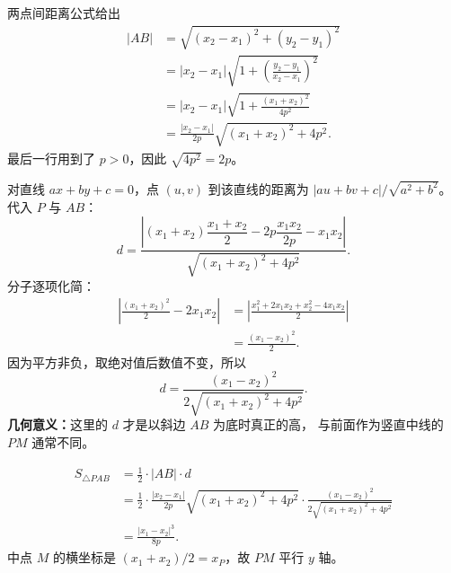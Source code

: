 \begin{proofbox}
\begin{description}[style=nextline, leftmargin=2.8em, labelsep=0.5em, itemsep=0.55em]
        \item[\textbf{第四步（求底边长度）：}]
        两点间距离公式给出
        \[
        \begin{aligned}
            |AB|
            &=\sqrt{(x_2-x_1)^2+(y_2-y_1)^2}\\
            &=|x_2-x_1|\sqrt{1+
              \left(\frac{y_2-y_1}{x_2-x_1}\right)^2}\\
            &=|x_2-x_1|\sqrt{1+
              \frac{(x_1+x_2)^2}{4p^2}}\\
            &=\boxed{\frac{|x_2-x_1|}{2p}
              \sqrt{(x_1+x_2)^2+4p^2}}.
        \end{aligned}
        \]
        最后一行用到了 $p>0$，因此 $\sqrt{4p^2}=2p$。

        \item[\textbf{第五步（求顶点到 $AB$ 的垂直距离）：}]
        对直线 $ax+by+c=0$，点 $(u,v)$ 到该直线的距离为
        $|au+bv+c|/\sqrt{a^2+b^2}$。代入 $P$ 与 $AB$：
        \[
            d=\frac{\left|(x_1+x_2)\dfrac{x_1+x_2}{2}
              -2p\dfrac{x_1x_2}{2p}-x_1x_2\right|}
              {\sqrt{(x_1+x_2)^2+4p^2}}.
        \]
        分子逐项化简：
        \[
        \begin{aligned}
            \left|\frac{(x_1+x_2)^2}{2}-2x_1x_2\right|
            &=\left|\frac{x_1^2+2x_1x_2+x_2^2-4x_1x_2}{2}\right|\\
            &=\frac{(x_1-x_2)^2}{2}.
        \end{aligned}
        \]
        因为平方非负，取绝对值后数值不变，所以
        \[
            \boxed{d=\frac{(x_1-x_2)^2}
              {2\sqrt{(x_1+x_2)^2+4p^2}}}.
        \]
        \textbf{几何意义：}这里的 $d$ 才是以斜边 $AB$ 为底时真正的高，
        与前面作为竖直中线的 $PM$ 通常不同。

        \item[\textbf{第六步（底乘高求面积并验证中线）：}]
        \[
        \begin{aligned}
            S_{\triangle PAB}
            &=\frac12\cdot|AB|\cdot d\\
            &=\frac12\cdot\frac{|x_2-x_1|}{2p}
               \sqrt{(x_1+x_2)^2+4p^2}\cdot
               \frac{(x_1-x_2)^2}{2\sqrt{(x_1+x_2)^2+4p^2}}\\
            &=\boxed{\frac{|x_1-x_2|^3}{8p}}.
        \end{aligned}
        \]
        中点 $M$ 的横坐标是 $(x_1+x_2)/2=x_P$，故 $PM$ 平行 $y$ 轴。
    \end{description}


\end{proofbox}
